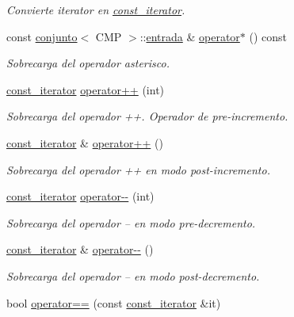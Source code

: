 \begin{DoxyCompactItemize}
\begin{DoxyCompactList}\small\item\em Convierte iterator en \hyperlink{classconjunto_1_1const__iterator}{const\-\_\-iterator}. \end{DoxyCompactList}\item 
const \hyperlink{classconjunto}{conjunto}$<$ C\-M\-P $>$\-::\hyperlink{classconjunto_a7630ace7cb17bcec07daf5804f1a0780}{entrada} \& \hyperlink{classconjunto_1_1const__iterator_a81266f325c36edccc0a2c05fd0cc7cda}{operator$\ast$} () const 
\begin{DoxyCompactList}\small\item\em Sobrecarga del operador asterisco. \end{DoxyCompactList}\item 
\hyperlink{classconjunto_1_1const__iterator}{const\-\_\-iterator} \hyperlink{classconjunto_1_1const__iterator_a9ab281204402103f6d674986eb63f80d}{operator++} (int)
\begin{DoxyCompactList}\small\item\em Sobrecarga del operador ++. Operador de pre-\/incremento. \end{DoxyCompactList}\item 
\hyperlink{classconjunto_1_1const__iterator}{const\-\_\-iterator} \& \hyperlink{classconjunto_1_1const__iterator_addf381813df873871ef3b56d04da3fc5}{operator++} ()
\begin{DoxyCompactList}\small\item\em Sobrecarga del operador ++ en modo post-\/incremento. \end{DoxyCompactList}\item 
\hyperlink{classconjunto_1_1const__iterator}{const\-\_\-iterator} \hyperlink{classconjunto_1_1const__iterator_a1603a6055e10f265ca251f761eceeca4}{operator-\/-\/} (int)
\begin{DoxyCompactList}\small\item\em Sobrecarga del operador -- en modo pre-\/decremento. \end{DoxyCompactList}\item 
\hyperlink{classconjunto_1_1const__iterator}{const\-\_\-iterator} \& \hyperlink{classconjunto_1_1const__iterator_a88c0fa127bc36fa925e80e532b59055d}{operator-\/-\/} ()
\begin{DoxyCompactList}\small\item\em Sobrecarga del operador -- en modo post-\/decremento. \end{DoxyCompactList}\item 
bool \hyperlink{classconjunto_1_1const__iterator_aa51158e92aeeec4c65ba9a4ba8047cbd}{operator==} (const \hyperlink{classconjunto_1_1const__iterator}{const\-\_\-iterator} \&it)

\end{DoxyCompactItemize}
